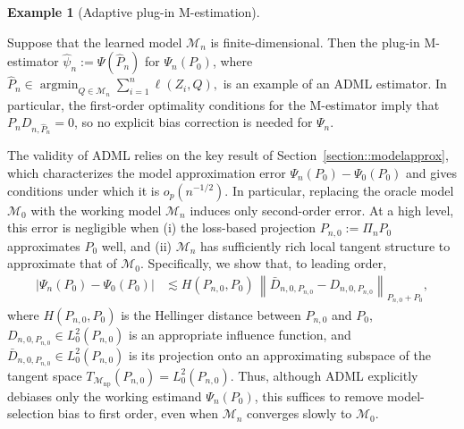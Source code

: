 \documentclass[11pt]{article}
\DeclareMathOperator*{\argmin}{argmin}
\theoremstyle{definition}
\newtheorem{example}{Example}
\begin{document}
\begin{example}[Adaptive plug-in M-estimation]
\label{example::mestimator}

Suppose that the learned model \(\mathcal{M}_n\) is finite-dimensional. Then the plug-in M-estimator \(\widehat{\psi}_n := \Psi(\widehat{P}_n)\) for \(\Psi_n(P_0)\), where $\widehat{P}_n \in \argmin_{Q \in \mathcal{M}_n} \sum_{i=1}^n \ell(Z_i, Q),$ is an example of an ADML estimator. In particular, the first-order optimality conditions for the M-estimator imply that \(P_n D_{n,\widehat{P}_n} = 0\), so no explicit bias correction is needed for \(\Psi_n\).
\end{example}


 

The validity of ADML relies on the key result of Section~\ref{section::modelapprox}, which characterizes the model approximation error \(\Psi_n(P_0)-\Psi_0(P_0)\) and gives conditions under which it is \(o_p(n^{-1/2})\). In particular, replacing the oracle model \(\mathcal{M}_0\) with the working model \(\mathcal{M}_n\) induces only second-order error. At a high level, this error is negligible when (i) the loss-based projection \(P_{n,0}:=\Pi_n P_0\) approximates \(P_0\) well, and (ii) \(\mathcal{M}_n\) has sufficiently rich local tangent structure to approximate that of \(\mathcal{M}_0\). Specifically, we show that, to leading order,
\begin{align*}
    \left|\Psi_n(P_0)-\Psi_0(P_0)\right|
    &\lesssim
    H(P_{n,0}, P_0)\,
    \left\|\bar{D}_{n,0,P_{n,0}} - D_{n,0,P_{n,0}}\right\|_{P_{n,0}+P_0},
\end{align*}
where \(H(P_{n,0}, P_0)\) is the Hellinger distance between \(P_{n,0}\) and \(P_0\), \(D_{n,0,P_{n,0}} \in L_0^2(P_{n,0})\) is an appropriate influence function, and \(\bar D_{n,0,P_{n,0}} \in L_0^2(P_{n,0})\) is its projection onto an approximating subspace of the tangent space \(T_{\mathcal{M}_{\mathrm{np}}}(P_{n,0}) = L_0^2(P_{n,0})\). Thus, although ADML explicitly debiases only the working estimand \(\Psi_n(P_0)\), this suffices to remove model-selection bias to first order, even when \(\mathcal{M}_n\) converges slowly to \(\mathcal{M}_0\).

 
 
\end{document}
